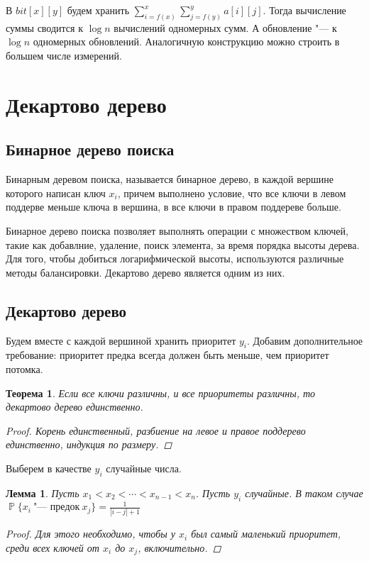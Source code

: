 \documentclass[12pt,a4paper]{article}
\theoremstyle{plain}
\newtheorem{thm}{Теорема}
\newtheorem{lem}{Лемма}
\DeclareMathOperator{\PP}{\mathbb{P}}
\newcommand{\prob}[1]{\PP\{#1\}}
\begin{document}
В $bit[x][y]$ будем хранить $\sum\limits_{i = f(x)}^{x}{\sum\limits_{j = f(y)}^{y}{a[i][j]}}$. Тогда вычисление суммы сводится к $\log{n}$ вычислений одномерных сумм.
А обновление "--- к $\log{n}$ одномерных обновлений. Аналогичную конструкцию можно строить в большем числе измерений.

\section{Декартово дерево}
\subsection{Бинарное дерево поиска}

Бинарным деревом поиска, называется бинарное дерево, в каждой вершине которого написан ключ $x_i$,
причем выполнено условие, что все ключи в левом поддерве меньше ключа в вершина,
в все ключи в правом поддереве больше.

Бинарное дерево поиска позволяет выполнять операции с множеством ключей,
такие как добавлние, удаление, поиск элемента, за время порядка высоты дерева.
Для того, чтобы добиться логарифмической высоты, используются различные методы балансировки.
Декартово дерево является одним из них.

\subsection{Декартово дерево}

Будем вместе с каждой вершиной хранить приоритет $y_i$.
Добавим дополнительное требование: приоритет предка всегда должен быть меньше, чем приоритет потомка.

\begin{thm}
Если все ключи различны, и все приоритеты различны, то декартово дерево единственно.
\begin{proof}
Корень единственный, разбиение на левое и правое поддерево единственно, индукция по размеру.
\end{proof}
\end{thm}

Выберем в качестве $y_i$ случайные числа.

\begin{lem}
Пусть $x_1 < x_2 < \cdots < x_{n-1} < x_{n}$. Пусть $y_i$ случайные.
В таком случае $\prob{x_i~\texttt{"--- предок}~x_j} = \frac{1}{|i - j|+1}$
\begin{proof}
Для этого необходимо, чтобы у $x_i$ был самый маленький приоритет, среди всех ключей от $x_i$ до $x_j$, включительно.
\end{proof}
\end{lem}
\end{document}
